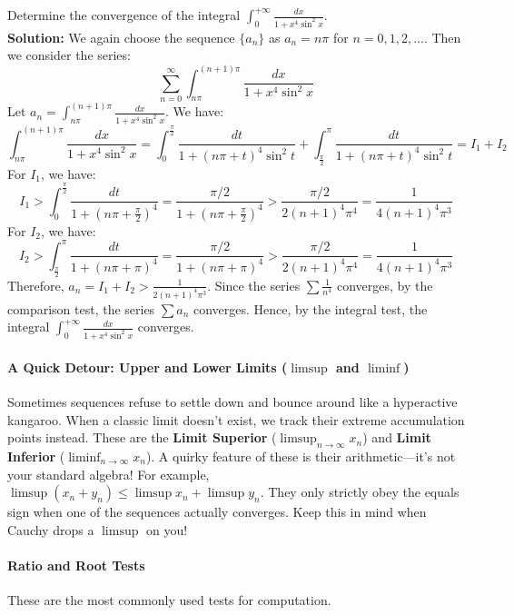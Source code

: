 \begin{example}
    Determine the convergence of the integral $\int_{0}^{+\infty} \frac{dx}{1 + x^4 \sin^2 x}$. \\
    \textbf{Solution:} We again choose the sequence $\{a_n\}$ as $a_n = n\pi$ for $n = 0, 1, 2, \ldots$. Then we consider the series:
    \[\sum_{n=0}^{\infty} \int_{n\pi}^{(n+1)\pi} \frac{dx}{1 + x^4 \sin^2 x}\]
    Let $a_n = \int_{n\pi}^{(n+1)\pi} \frac{dx}{1 + x^4 \sin^2 x}$. We have:
    \[
    \int_{n\pi}^{(n+1)\pi} \frac{dx}{1 + x^4 \sin^2 x}
    = \int_{0}^{\frac{\pi}{2}} \frac{dt}{1 + (n\pi + t)^4 \sin^2 t} + \int_{\frac{\pi}{2}}^{\pi} \frac{dt}{1 + (n\pi + t)^4 \sin^2 t} = I_1 + I_2
    \]
    For $I_1$, we have:
    \[I_1 > \int_{0}^{\frac{\pi}{2}} \frac{dt}{1 + (n\pi + \frac{\pi}{2})^4} = \frac{\pi/2}{1 + (n\pi + \frac{\pi}{2})^4} > \frac{\pi/2}{2(n+1)^4 \pi^4} = \frac{1}{4(n+1)^4 \pi^3}\]
    For $I_2$, we have:
    \[I_2 > \int_{\frac{\pi}{2}}^{\pi} \frac{dt}{1 + (n\pi + \pi)^4} = \frac{\pi/2}{1 + (n\pi + \pi)^4} > \frac{\pi/2}{2(n+1)^4 \pi^4} = \frac{1}{4(n+1)^4 \pi^3}\]
    Therefore, $a_n = I_1 + I_2 > \frac{1}{2(n+1)^4 \pi^3}$. Since the series $\sum \frac{1}{n^4}$ converges, by the comparison test, the series $\sum a_n$ converges. Hence, by the integral test, the integral $\int_{0}^{+\infty} \frac{dx}{1 + x^4 \sin^2 x}$ converges.
\end{example}

\paragraph{A Quick Detour: Upper and Lower Limits ($\limsup$ and $\liminf$)}
Sometimes sequences refuse to settle down and bounce around like a hyperactive kangaroo. When a classic limit doesn't exist, we track their extreme accumulation points instead. These are the \textbf{Limit Superior} ($\limsup_{n \to \infty} x_n$) and \textbf{Limit Inferior} ($\liminf_{n \to \infty} x_n$). 
A quirky feature of these is their arithmetic—it's not your standard algebra! For example, $\limsup (x_n + y_n) \le \limsup x_n + \limsup y_n$. They only strictly obey the equals sign when one of the sequences actually converges. Keep this in mind when Cauchy drops a $\limsup$ on you!

\paragraph{Ratio and Root Tests}
These are the most commonly used tests for computation.

